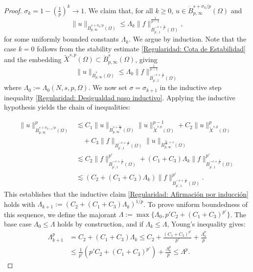 \documentclass[]{amsart}
\theoremstyle{definition}
\theoremstyle{definition}
\theoremstyle{remark}
\numberwithin{equation}{section}
\begin{document}
\begin{proof}
         \(\sigma_{k}=1- \left(\frac{1}{p}\right)^{k} \to 1\). 
        We claim that, for all $k\ge0$, \(u \in \dot{B}_{p, \infty}^{s+\sigma_{k} / p}(\Omega)\) and
		\begin{equation}
			\label{Regularidad: Afirmación por inducción}
			\|u\|_{\dot{B}_{p, \infty}^{s+\sigma_{k} / p}(\Omega)} \leq \Lambda_{k}\|f\|^{\frac{1}{p-1}}_{B_{p^{\prime}, 1}^{-s+\frac{1}{p'}}(\Omega)},
		\end{equation}
		for some uniformly bounded constants \(\Lambda_{k}\). We argue by induction. Note that the case \(k=0\) follows from the stability estimate \eqref{Regularidad: Cota de Estabilidad} and the embedding \(\widetilde{X}^{s,p}(\Omega) \subset \dot{B}_{p, \infty}^{s}(\Omega)\), giving
		\[
		\|u\|_{\dot{B}_{p, \infty}^{s}(\Omega)} \leq \Lambda_{0}\|f\|_{B_{p^{\prime}, 1}^{-s+\frac{1}{p^{\prime}}}(\Omega)}^{\frac{1}{p-1}}
		\]
		where \(\Lambda_{0}:=\Lambda_{0}(N, s, p, \Omega)\). We now set \(\sigma = \sigma_{k+1}\) in the inductive step inequality \eqref{Regularidad: Desigualdad paso inductivo}. Applying the inductive hypothesis yields the chain of inequalities:
		
		\[
		\begin{aligned}
			\|u\|_{\dot{B}_{p, \infty}^{s+\sigma_{k+1}/p}(\Omega)}^p 
			& \lesssim  C_1 \|u\|_{\dot{B}^{s+\frac{\sigma_k}{p}}_{p,\infty}(\Omega)}\|u\|^{p-1}_{\widetilde{X}^{s,p}(\Omega)}+C_2\|u\|^{p}_{\widetilde{X}^{s,p}(\Omega)} \\ & \quad + C_3\|f\|_{B_{p^{\prime}, 1}^{-s+\frac{1}{p'}}(\Omega)}\|u\|_{\dot{B}_{p, \infty}^{\frac{\sigma_k}{p}+s}(\Omega)} \\
			& \lesssim C_2 \|f\|^{p'}_{B_{p^{\prime}, 1}^{-s+\frac{1}{p'}}(\Omega)}+(C_1+C_3)  \Lambda_k \|f\|^{p'}_{B_{p^{\prime}, 1}^{-s+\frac{1}{p'}}(\Omega)}\\
			& \lesssim \left(C_2 + (C_1+C_3) \Lambda_k\right) \|f\|^{p'}_{B_{p^{\prime}, 1}^{-s+\frac{1}{p'}}(\Omega)}.
		\end{aligned}
		\]
		This establishes that the inductive claim \eqref{Regularidad: Afirmación por inducción} holds with \(\Lambda_{k+1} := (C_2 + (C_1+C_3) \Lambda_k)^{1/p}\). To prove uniform boundedness of this sequence, we define the majorant \(\Lambda := \max\{\Lambda_0, p'C_2+(C_1+C_3)^{p'} \}\). The base case \(\Lambda_0 \leq \Lambda\) holds by construction, and if \(\Lambda_k \leq \Lambda\), Young's inequality gives:	
		\[
		\begin{aligned}
			\Lambda_{k+1}^p &= C_2 + (C_1+C_3) \Lambda_k \leq  C_2 + \frac{(C_1+C_3)^{p'}}{p'}  +   \frac{\Lambda^{p}_{k}}{p} \\
			& \leq \frac{1}{p'}\left(p'C_2+(C_1+C_3)^{p'}\right) +\frac{\Lambda^{p}_k}{p} \leq \Lambda^p.
		\end{aligned}
		\]
		

\end{proof}
\end{document}
